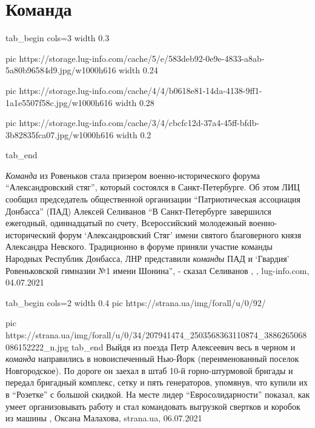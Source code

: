  
 
 
 
 
\chapter{Команда}


\ifcmt
  tab_begin cols=3
   	 width 0.3

     pic https://storage.lug-info.com/cache/5/e/583deb92-0e9e-4833-a8ab-5a80b96584d9.jpg/w1000h616
		 width 0.24

     pic https://storage.lug-info.com/cache/4/4/b0618e81-14da-4138-9ff1-1a1e5507f58c.jpg/w1000h616
		 width 0.28

		 pic https://storage.lug-info.com/cache/3/4/cbcfc12d-37a4-45ff-bfdb-3b82835fca07.jpg/w1000h616
		 width 0.2

  tab_end
\fi

\emph{Команда} из Ровеньков стала призером военно-исторического форума
\enquote{Александровский стяг}, который состоялся в Санкт-Петербурге. Об этом
ЛИЦ сообщил председатель общественной организации \enquote{Патриотическая
ассоциация Донбасса} (ПАД) Алексей Селиванов \enquote{В Санкт-Петербурге
завершился ежегодный, одиннадцатый по счету, Всероссийский молодежный
военно-исторический форум \enquote{Александровский Стяг} имени святого
благоверного князя Александра Невского. Традиционно в форуме приняли участие
команды Народных Республик Донбасса, ЛНР представили \emph{команды} ПАД и
\enquote{Гвардия} Ровеньковской гимназии №1 имени Шонина}, - сказал Селиванов
, , lug-info.com,
04.07.2021

\ifcmt
tab_begin cols=2
	width 0.4
  pic https://strana.ua/img/forall/u/0/92/%

	pic https://strana.ua/img/forall/u/0/34/207941474_2503568363110874_3886265068086152222_n.jpg
tab_end
\fi
Выйдя из поезда Петр Алексеевич весь в черном и \emph{команда} направились в
новоиспеченный Нью-Йорк (переименованный поселок Новгородское). По дороге он
заехал в штаб 10-й горно-штурмовой бригады и передал бригадный комплекс, сетку
и пять генераторов, упомянув, что купили их в \enquote{Розетке} с большой скидкой.  На
месте лидер \enquote{Евросолидарности} показал, как умеет организовывать работу и стал
командовать выгрузкой свертков и коробок из машины
, 
Оксана Малахова, strana.ua, 06.07.2021

